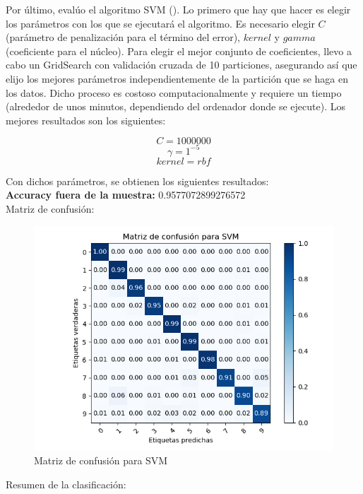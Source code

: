 \newpage

Por último, evalúo el algoritmo SVM (\cite{svc}). Lo primero que hay que hacer es elegir los parámetros con los que se ejecutará el algoritmo. Es necesario elegir $C$ (parámetro de penalización para el término del error), $kernel$ y $gamma$ (coeficiente para el núcleo). Para elegir el mejor conjunto de coeficientes, llevo a cabo un GridSearch con validación cruzada de 10 particiones, asegurando así que elijo los mejores parámetros independientemente de la partición que se haga en los datos. Dicho proceso es costoso computacionalmente y requiere un tiempo (alrededor de unos minutos, dependiendo del ordenador donde se ejecute). Los mejores resultados son los siguientes:

$$ C = 1000000$$
$$ \gamma = 1^{-5} $$
$$ kernel = rbf $$

Con dichos parámetros, se obtienen los siguientes resultados: \\

\textbf{Accuracy fuera de la muestra:}  0.9577072899276572\\

Matriz de confusión:

\begin{figure}[H] %
	\centering
	\includegraphics[scale=0.8]{conf-m-svm.png}  %
	\caption{Matriz de confusión para SVM} 
	\label{fig:conf-m-svm}
\end{figure}

\newpage
Resumen de la clasificación:


